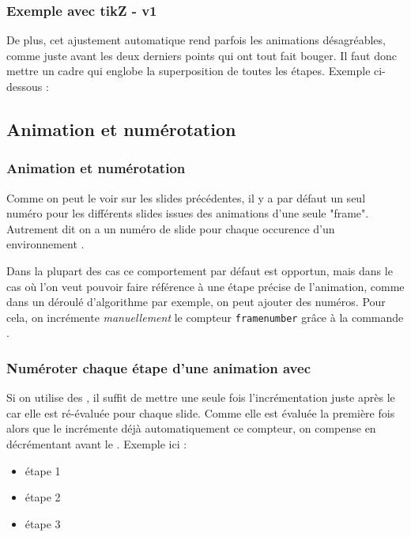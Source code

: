 \begin{frame} [fragile]
  \frametitle{Exemple avec tikZ - v1}
  
  De plus, cet ajustement automatique rend parfois les animations désagréables,
  comme juste avant les deux derniers points qui ont tout fait bouger.
  Il faut donc mettre un cadre qui englobe la superposition de toutes les étapes.
  Exemple ci-dessous :
  \begin{center}
  \end{center}

\end{frame}



\subsection{Animation et numérotation}
\begin{frame}
\frametitle{Animation et numérotation\esp}
	Comme on peut le voir sur les slides précédentes, il y a par défaut un seul numéro pour les différents slides issues des animations d'une seule "frame". 
	Autrement dit on a un numéro de slide pour chaque occurence d'un environnement .
	\medskip
	
	Dans la plupart des cas ce comportement par défaut est opportun, mais dans le cas où l'on veut pouvoir faire référence à une étape précise de l'animation, comme dans un déroulé d'algorithme par exemple, on peut ajouter des numéros.
	Pour cela, on incrémente \textit{manuellement} le compteur \texttt{framenumber} grâce à la commande \lin{\addtocounter{framenumber}{1}}.
\end{frame}

\addtocounter{framenumber}{-1}
\begin{frame}
\frametitle{Numéroter chaque étape d'une animation avec \lin{\pause}}
 	\addtocounter{framenumber}{1}
	Si on utilise des \lin{\pause}, il suffit de mettre une seule fois l'incrémentation \lin{\addtocounter{framenumber}{1}} juste après le \lin{\begin{frame}} car elle est ré-évaluée pour chaque slide.
	Comme elle est évaluée la première fois alors que le \lin{\begin{frame}} incrémente déjà automatiquement ce compteur, on compense en décrémentant avant le \lin{\begin{frame}}.
	\medskip
	Exemple ici  : 
	\begin{itemize}
		\item étape 1 \pause
		\item étape 2 \pause
		\item étape 3 \pause
	\end{itemize}
	
\end{frame}

